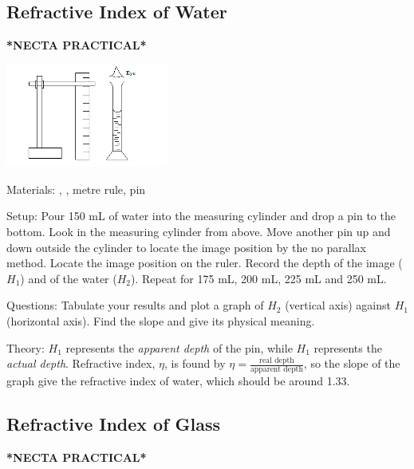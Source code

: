 \begin{multicols}{2}
\subsection{Refractive Index of Water}
\textbf{*NECTA PRACTICAL*}

\begin{center}
\includegraphics[width=0.4\textwidth]{./img/refractive-index-water.png}
\end{center}

\begin{description*}
\item[Materials:]{, , metre rule, pin}
\item[Setup:]{Pour 150 mL of water into the measuring cylinder and drop a pin to the bottom. Look in the measuring cylinder from above. Move another pin up and down outside the cylinder to locate the image position by the no parallax method. Locate the image position on the ruler. Record the depth of the image ($H_1$) and of the water ($H_2$). Repeat for 175 mL, 200 mL, 225 mL and 250 mL.}
\item[Questions:]{Tabulate your results and plot a graph of $H_2$ (vertical axis) against $H_1$ (horizontal axis). Find the slope and give its physical meaning.}
\item[Theory:]{$H_1$ represents the \emph{apparent depth} of the pin, while $H_1$ represents the \emph{actual depth}. Refractive index, $\eta$, is found by $\eta = \frac{\text{real depth}}{\text{apparent depth}}$, so the slope of the graph give the refractive index of water, which should be around 1.33.}
\end{description*}

\subsection{Refractive Index of Glass} \label{sub:refr-index-glass}
\textbf{*NECTA PRACTICAL*}


\end{multicols}
